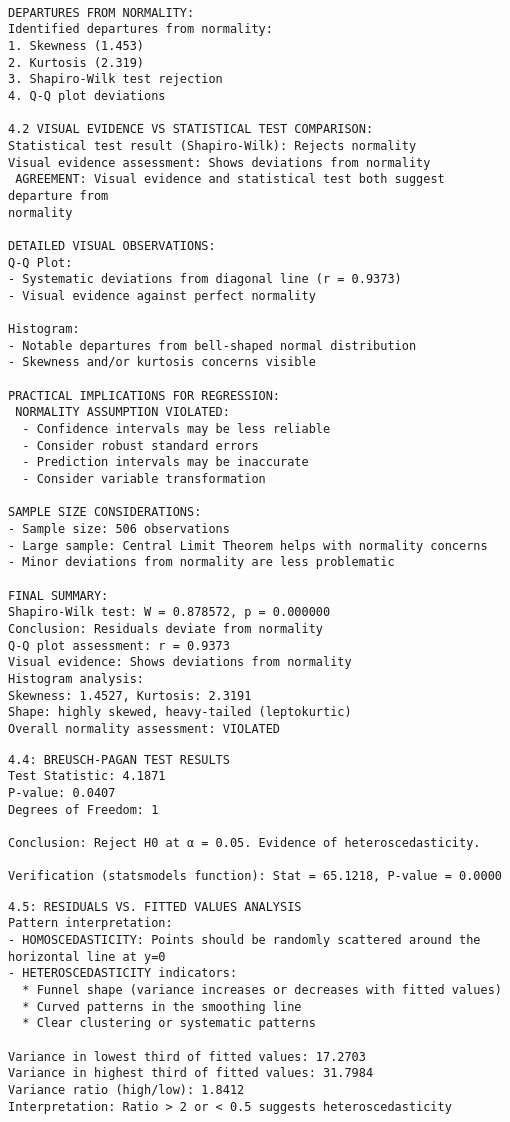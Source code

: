 \documentclass[8pt, twocolumn]{extarticle}
\begin{document}
    \centering
    \begin{Verbatim}[commandchars=\\\{\}]

DEPARTURES FROM NORMALITY:
Identified departures from normality:
1. Skewness (1.453)
2. Kurtosis (2.319)
3. Shapiro-Wilk test rejection
4. Q-Q plot deviations

4.2 VISUAL EVIDENCE VS STATISTICAL TEST COMPARISON:
Statistical test result (Shapiro-Wilk): Rejects normality
Visual evidence assessment: Shows deviations from normality
 AGREEMENT: Visual evidence and statistical test both suggest departure from
normality

DETAILED VISUAL OBSERVATIONS:
Q-Q Plot:
- Systematic deviations from diagonal line (r = 0.9373)
- Visual evidence against perfect normality

Histogram:
- Notable departures from bell-shaped normal distribution
- Skewness and/or kurtosis concerns visible

PRACTICAL IMPLICATIONS FOR REGRESSION:
 NORMALITY ASSUMPTION VIOLATED:
  - Confidence intervals may be less reliable
  - Consider robust standard errors
  - Prediction intervals may be inaccurate
  - Consider variable transformation

SAMPLE SIZE CONSIDERATIONS:
- Sample size: 506 observations
- Large sample: Central Limit Theorem helps with normality concerns
- Minor deviations from normality are less problematic

FINAL SUMMARY:
Shapiro-Wilk test: W = 0.878572, p = 0.000000
Conclusion: Residuals deviate from normality
Q-Q plot assessment: r = 0.9373
Visual evidence: Shows deviations from normality
Histogram analysis:
Skewness: 1.4527, Kurtosis: 2.3191
Shape: highly skewed, heavy-tailed (leptokurtic)
Overall normality assessment: VIOLATED
    \end{Verbatim}
    \begin{Verbatim}[commandchars=\\\{\}]
4.4: BREUSCH-PAGAN TEST RESULTS
Test Statistic: 4.1871
P-value: 0.0407
Degrees of Freedom: 1

Conclusion: Reject H0 at α = 0.05. Evidence of heteroscedasticity.

Verification (statsmodels function): Stat = 65.1218, P-value = 0.0000
    \end{Verbatim}
    \begin{Verbatim}[commandchars=\\\{\}]
4.5: RESIDUALS VS. FITTED VALUES ANALYSIS
Pattern interpretation:
- HOMOSCEDASTICITY: Points should be randomly scattered around the horizontal line at y=0
- HETEROSCEDASTICITY indicators:
  * Funnel shape (variance increases or decreases with fitted values)
  * Curved patterns in the smoothing line
  * Clear clustering or systematic patterns

Variance in lowest third of fitted values: 17.2703
Variance in highest third of fitted values: 31.7984
Variance ratio (high/low): 1.8412
Interpretation: Ratio > 2 or < 0.5 suggests heteroscedasticity
    \end{Verbatim}
\end{document}
